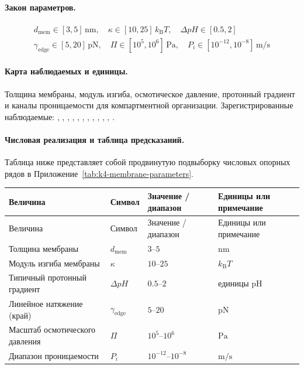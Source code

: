 \paragraph{Закон параметров.}
\[
\begin{gathered} d_{\mathrm{mem}} \in [3, 5]\,\mathrm{nm},\quad \kappa \in [10, 25]\,k_{\mathrm{B}}T,\quad \Delta pH \in [0.5, 2] \\ \gamma_{\mathrm{edge}} \in [5,20]\,\mathrm{pN},\quad \Pi \in [10^5,10^6]\,\mathrm{Pa},\quad P_i \in [10^{-12},10^{-8}]\,\mathrm{m/s} \end{gathered}
\]

\paragraph{Карта наблюдаемых и единицы.}
Толщина мембраны, модуль изгиба, осмотическое давление, протонный градиент и каналы проницаемости для компартментной организации.
Зарегистрированные наблюдаемые: , \allowbreak {}, \allowbreak {}, \allowbreak {}, \allowbreak {}, \allowbreak {}, \allowbreak {}, \allowbreak {}, \allowbreak {}, \allowbreak {}, \allowbreak {}, \allowbreak {}.

\paragraph{Числовая реализация и таблица предсказаний.}
Таблица ниже представляет собой продвинутую подвыборку числовых опорных рядов в Приложение~\ref{tab:k4-membrane-parameters}.
\begin{longtable}{@{}L{0.27\textwidth}L{0.15\textwidth}L{0.24\textwidth}L{0.16\textwidth}@{}}
\toprule
Величина & Символ & Значение / диапазон & Единицы или примечание \\
\midrule
\endfirsthead
\toprule
Величина & Символ & Значение / диапазон & Единицы или примечание \\
\midrule
\endhead
Толщина мембраны & $\scriptstyle d_{\mathrm{mem}}$ & $3\text{--}5$ & $\mathrm{nm}$ \\
Модуль изгиба мембраны & $\scriptstyle \kappa$ & $10\text{--}25$ & $k_{\mathrm{B}}T$ \\
Типичный протонный градиент & $\scriptstyle \Delta pH$ & $0.5\text{--}2$ & единицы pH \\
Линейное натяжение (край) & $\scriptstyle \gamma_{\mathrm{edge}}$ & $5\text{--}20$ & $\mathrm{pN}$ \\
Масштаб осмотического давления & $\scriptstyle \Pi$ & $10^5\text{--}10^6$ & $\mathrm{Pa}$ \\
Диапазон проницаемости & $\scriptstyle P_i$ & $10^{-12}\text{--}10^{-8}$ & $\mathrm{m/s}$ \\
\bottomrule
\end{longtable}

